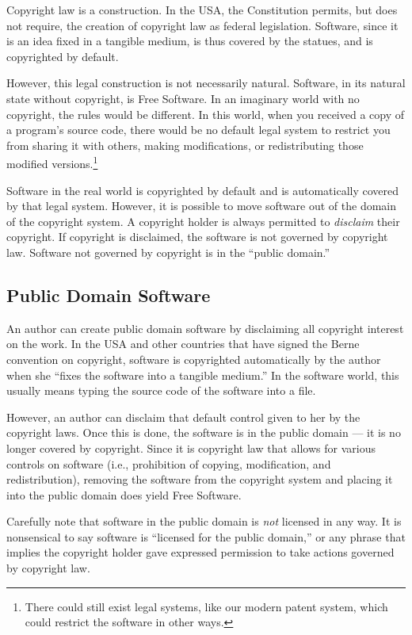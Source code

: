 \documentclass[11pt, letterpaper]{book}
\newcommand{\defn}[1]{\emph{#1}}
\begin{document}
Copyright law is a construction. In the USA, the Constitution permits,
but does not require, the creation of copyright law as federal
legislation. Software, since it is an idea fixed in a tangible medium, is
thus covered by the statues, and is copyrighted by default.

However, this legal construction is not necessarily natural. Software, in
its natural state without copyright, is Free Software. In an imaginary
world with no copyright, the rules would be different. In this
world, when you received a copy of a program's source code, there would be
no default legal system to restrict you from sharing it with others,
making modifications, or redistributing those modified
versions.\footnote{There could still exist legal systems, like our modern
  patent system, which could restrict the software in other ways.}

Software in the real world is copyrighted by default and is
automatically covered by that legal system. However, it is possible
to move software out of the domain of the copyright system. A
copyright holder is always permitted to \defn{disclaim} their
copyright. If copyright is disclaimed, the software is not governed
by copyright law. Software not governed by copyright is in the
``public domain.''

\subsection{Public Domain Software}

An author can create public domain software by disclaiming all copyright
interest on the work. In the USA and other countries that have signed the
Berne convention on copyright, software is copyrighted automatically by
the author when she ``fixes the software into a tangible medium.''  In
the software world, this usually means typing the source code of the
software into a file.

However, an author can disclaim that default control given to her by the
copyright laws. Once this is done, the software is in the public domain
--- it is no longer covered by copyright. Since it is copyright law that
allows for various controls on software (i.e., prohibition of copying,
modification, and redistribution), removing the software from the
copyright system and placing it into the public domain does yield Free
Software.

Carefully note that software in the public domain is \emph{not} licensed
in any way. It is nonsensical to say software is ``licensed for the
public domain,'' or any phrase that implies the copyright holder gave
expressed permission to take actions governed by copyright law.
\end{document}
